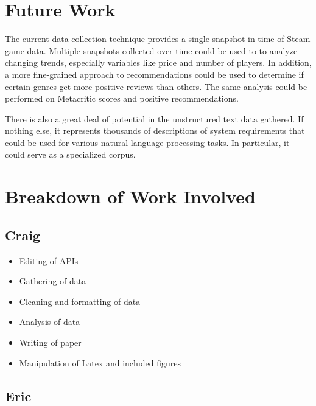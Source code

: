 \documentclass[letterpaper,10pt,twocolumn]{article}
\begin{document}

\section{Future Work}

The current data collection technique provides a single snapshot in time of
Steam game data. Multiple snapshots collected over time could be used to to
analyze changing trends, especially variables like price and number of
players. In addition, a more fine-grained approach to recommendations could be
used to determine if certain genres get more positive reviews than others. The
same analysis could be performed on Metacritic scores and positive
recommendations.

There is also a great deal of potential in the unstructured text data gathered.
If nothing else, it represents thousands of descriptions of system requirements
that could be used for various natural language processing tasks. In particular, it
could serve as a specialized corpus.


\section{Breakdown of Work Involved}

\subsection{Craig}

\begin{itemize}
    \item Editing of APIs
    \item Gathering of data
    \item Cleaning and formatting of data
    \item Analysis of data
    \item Writing of paper
    \item Manipulation of Latex and included figures
\end{itemize}

\subsection{Eric}
\end{document}
